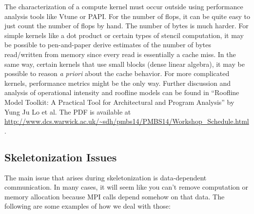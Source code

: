 The characterization of a compute kernel must occur outside \sstmacro using performance analysis tools like Vtune or PAPI.
For the number of flops, it can be quite easy to just count the number of flops by hand.
The number of bytes is much harder.
For simple kernels like a dot product or certain types of stencil computation, 
it may be possible to pen-and-paper derive estimates of the number of bytes read/written from memory since every read is essentially a cache miss.
In the same way, certain kernels that use small blocks (dense linear algebra), it may be possible to reason \textit{a priori} about the cache behavior.
For more complicated kernels, performance metrics might be the only way.
Further discussion and analysis of operational intensity and roofline models can be found in ``Roofline Model Toolkit: A Practical Tool for Architectural and Program Analysis'' by Yung Ju Lo et al.  The PDF is available at \url{http://www.dcs.warwick.ac.uk/~sdh/pmbs14/PMBS14/Workshop_Schedule.html}.

\subsection{Skeletonization Issues}

The main issue that arises during skeletonization is data-dependent communication.  In many cases, it will seem like you can't remove computation or memory allocation because MPI calls depend somehow on that data.  The following are some examples of how we deal with those:

